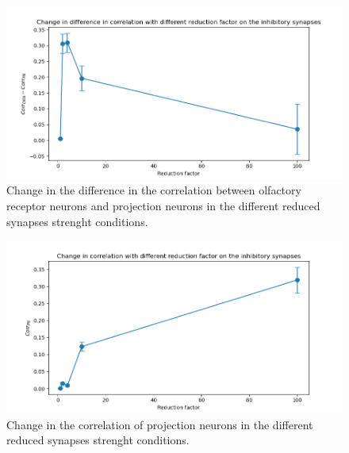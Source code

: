 \begin{figure}
  \centering
  \includegraphics[width=\textwidth]{change_in_correlation_asleep}
  \caption{Change in the difference in the correlation between olfactory receptor neurons and projection neurons in the different reduced synapses strenght conditions.}
  \label{fig:correlation-change-normalized}
\end{figure}

\begin{figure}
  \centering
  \includegraphics[width=\textwidth]{change_in_correlation_asleep_pn}
  \caption{Change in the correlation of projection neurons in the different reduced synapses strenght conditions.}
  \label{fig:correlation-change}
\end{figure}

